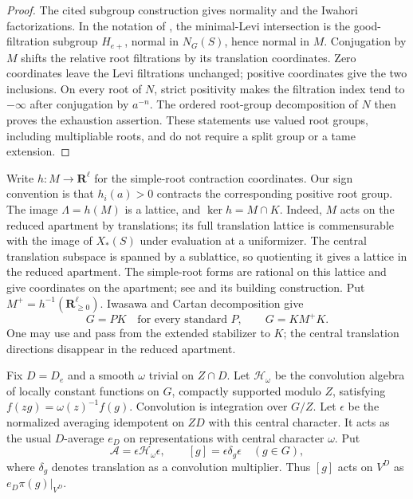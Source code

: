 \documentclass[10pt,letterpaper]{amsart}
\numberwithin{equation}{section}
\theoremstyle{remark}
\begin{document}
\begin{proof}
The cited subgroup construction gives normality and the Iwahori
factorizations. In the notation of \cite[Section~I.2]{SS}, the minimal-Levi
intersection is the good-filtration subgroup $H_{e+}$, normal in
$N_G(S)$, hence normal in $M$.
Conjugation by $M$ shifts the relative root filtrations by its translation
coordinates. Zero coordinates leave the Levi filtrations unchanged;
positive coordinates give the two inclusions. On every root of $N$, strict
positivity makes the filtration index tend to $-\infty$ after conjugation
by $a^{-n}$. The ordered root-group decomposition of $N$ then proves the
exhaustion assertion. These statements use valued root groups, including
multipliable roots, and do not require a split group or a tame extension.
\end{proof}

Write $h:M\to\mathbf R^\ell$ for the simple-root contraction coordinates.
Our sign convention is that $h_i(a)>0$ contracts the corresponding positive
root group. The image $\Lambda=h(M)$ is a lattice, and
$\ker h=M\cap K$. Indeed, $M$ acts on the reduced apartment by translations;
its full translation lattice is commensurable with the image of $X_*(S)$
under evaluation at a uniformizer. The central translation subspace is
spanned by a sublattice, so quotienting it gives a lattice in the reduced
apartment. The simple-root forms are rational on this lattice and give
coordinates on the apartment; see \cite[Lemma~3.3(b)]{Solleveld} and its
building construction.
Put $M^+=h^{-1}(\mathbf R_{\ge0}^\ell)$. Iwasawa and Cartan decomposition give
\begin{equation}\label{eq:group-decompositions}
 G=PK\quad\text{for every standard }P,\qquad G=KM^+K.
\end{equation}
One may use \cite[Theorems~3.13--3.14]{Solleveld} and pass from the extended
stabilizer to $K$; the central translation directions disappear in the
reduced apartment.

Fix $D=D_e$ and a smooth $\omega$ trivial on $Z\cap D$. Let
$\mathcal H_\omega$ be the convolution algebra of locally constant functions
on $G$, compactly supported modulo $Z$, satisfying
$f(zg)=\omega(z)^{-1}f(g)$. Convolution is integration over $G/Z$.
Let $\epsilon$ be the normalized averaging idempotent on $ZD$ with this
central character. It acts as the usual $D$-average $e_D$ on representations
with central character $\omega$. Put
\[
 \mathcal A=\epsilon\mathcal H_\omega\epsilon,
 \qquad [g]=\epsilon\delta_g\epsilon\quad(g\in G),
\]
where $\delta_g$ denotes translation as a convolution multiplier. Thus
$[g]$ acts on $V^D$ as $e_D\pi(g)|_{V^D}$.
\end{document}
